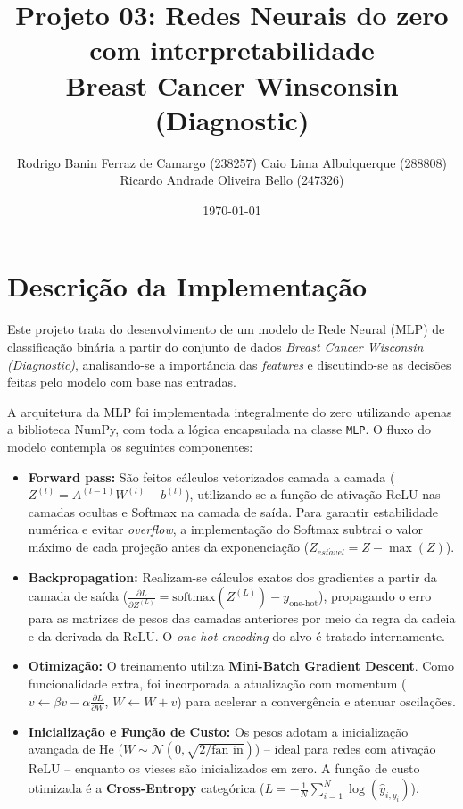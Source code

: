 \documentclass[10pt,a4paper]{article}
\title{Projeto 03: Redes Neurais do zero com interpretabilidade\\ \large Breast Cancer Winsconsin (Diagnostic)}
\author{
  \small
  Rodrigo Banin Ferraz de Camargo (238257)
  \textbullet{}
    Caio Lima Albulquerque (288808) \\ \small Ricardo Andrade Oliveira Bello (247326)
  \date{\small\today}
}
\begin{document}
\maketitle

\section{Descrição da Implementação}
Este projeto trata do desenvolvimento de um modelo de Rede Neural (MLP) de classificação binária a partir do conjunto de dados \textit{Breast Cancer Wisconsin (Diagnostic)}, analisando-se a importância das \textit{features} e discutindo-se as decisões feitas pelo modelo com base nas entradas. 

A arquitetura da MLP foi implementada integralmente do zero utilizando apenas a biblioteca NumPy, com toda a lógica encapsulada na classe \texttt{MLP}. O fluxo do modelo contempla os seguintes componentes:

\begin{itemize}
    \item \textbf{Forward pass:} São feitos cálculos vetorizados camada a camada ($Z^{(l)} = A^{(l-1)} W^{(l)} + b^{(l)}$), utilizando-se a função de ativação ReLU nas camadas ocultas e Softmax na camada de saída. Para garantir estabilidade numérica e evitar \textit{overflow}, a implementação do Softmax subtrai o valor máximo de cada projeção antes da exponenciação ($Z_{est\acute{a}vel} = Z - \max(Z)$).
    
    \item \textbf{Backpropagation:} Realizam-se cálculos exatos dos gradientes a partir da camada de saída ($\frac{\partial L}{\partial Z^{(L)}} = \text{softmax}(Z^{(L)}) - y_{\text{one-hot}}$), propagando o erro para as matrizes de pesos das camadas anteriores por meio da regra da cadeia e da derivada da ReLU. O \textit{one-hot encoding} do alvo é tratado internamente.
    
    \item \textbf{Otimização:} O treinamento utiliza \textbf{Mini-Batch Gradient Descent}. Como funcionalidade extra, foi incorporada a atualização com momentum ($v \leftarrow \beta v - \alpha \frac{\partial L}{\partial W}$, $W \leftarrow W + v$) para acelerar a convergência e atenuar oscilações.
    
    \item \textbf{Inicialização e Função de Custo:} Os pesos adotam a inicialização avançada de He ($W \sim \mathcal{N}(0, \sqrt{2 / \text{fan\_in}})$) -- ideal para redes com ativação ReLU -- enquanto os vieses são inicializados em zero. A função de custo otimizada é a \textbf{Cross-Entropy} categórica ($L = -\frac{1}{N} \sum_{i=1}^{N} \log(\hat{y}_{i, y_i})$).
\end{itemize}
\end{document}
